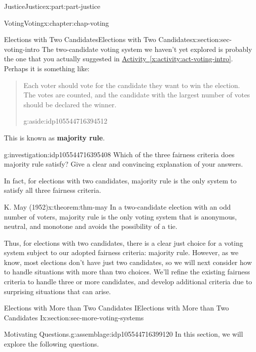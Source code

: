 \documentclass[oneside,10pt,]{book}
\newcommand{\xreffont}{\relax}
\newcommand{\terminology}[1]{\textbf{#1}}
\numberwithin{equation}{section}
\begin{document}
\begin{partptx}{Justice}{}{Justice}{}{}{x:part:part-justice}
\begin{chapterptx}{Voting}{}{Voting}{}{}{x:chapter:chap-voting}
\begin{sectionptx}{Elections with Two Candidates}{}{Elections with Two Candidates}{}{}{x:section:sec-voting-intro}
The two-candidate voting system we haven't yet explored is probably the one that you actually suggested in \hyperref[x:activity:act-voting-intro]{Activity~{\xreffont\ref{x:activity:act-voting-intro}}}. Perhaps it is something like:%
\begin{quote}%
Each voter should vote for the candidate they want to win the election. The votes are counted, and the candidate with the largest number of votes should be declared the winner.\begin{aside}{}{g:aside:idp105544716394512}%
\end{aside}
\end{quote}
This is known as \terminology{majority rule}.%
\begin{investigation}{}{g:investigation:idp105544716395408}%
Which of the three fairness criteria does majority rule satisfy? Give a clear and convincing explanation of your answers.%
\end{investigation}%
In fact, for elections with two candidates, majority rule is the only system to satisfy all three fairness criteria.%
\begin{theorem}{}{K. May (1952)}{x:theorem:thm-may}%
In a two-candidate election with an odd number of voters, majority rule is the only voting system that is anonymous, neutral, and monotone and avoids the possibility of a tie.%
\end{theorem}
\begin{conclusion}{}%
Thus, for elections with two candidates, there is a clear just choice for a voting system subject to our adopted fairness criteria: majority rule. However, as we know, most elections don't have just two candidates, so we will next consider how to handle situations with more than two choices. We'll refine the existing fairness criteria to handle three or more candidates, and develop additional criteria due to surprising situations that can arise.%
\end{conclusion}%
\end{sectionptx}
%
%
\typeout{************************************************}
\typeout{************************************************}
%
\begin{sectionptx}{Elections with More than Two Candidates I}{}{Elections with More than Two Candidates I}{}{}{x:section:sec-more-voting-systems}
\begin{assemblage}{Motivating Questions.}{g:assemblage:idp105544716399120}%
In this section, we will explore the following questions. %

\end{assemblage}
\end{sectionptx}
\end{chapterptx}
\end{partptx}
\end{document}
